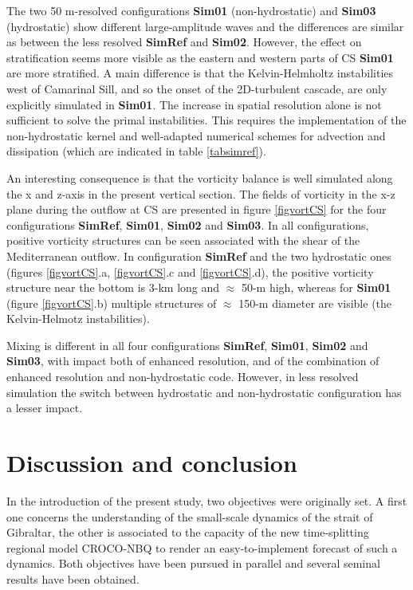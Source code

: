 \documentclass[a4paper,12pt]{article}
\begin{document}
The two 50 m-resolved configurations \textbf{Sim01} (non-hydrostatic) and \textbf{Sim03} (hydrostatic) show different large-amplitude waves and the differences are similar as between the less resolved \textbf{SimRef} and \textbf{Sim02}. However, the effect on stratification seems more visible as the eastern and western parts of CS \textbf{Sim01} are more stratified. A main difference is that the Kelvin-Helmholtz instabilities west of Camarinal Sill, and so the onset of the 2D-turbulent cascade, are only explicitly simulated in \textbf{Sim01}.
The increase in spatial resolution alone is not sufficient to solve the primal instabilities. This requires the implementation of the non-hydrostatic kernel and well-adapted numerical schemes for advection and dissipation (which are indicated in table \ref{tabsimref}).
 
An interesting consequence is that the vorticity balance is well simulated along the x and z-axis in the present vertical section. The fields of vorticity in the x-z plane during the outflow at CS are presented in figure \ref{figvortCS} for the four configurations \textbf{SimRef}, \textbf{Sim01}, \textbf{Sim02} and \textbf{Sim03}. In all configurations, positive vorticity structures can be seen associated with the shear of the Mediterranean outflow. In configuration \textbf{SimRef} and the two hydrostatic ones (figures \ref{figvortCS}.a, \ref{figvortCS}.c and \ref{figvortCS}.d), the positive vorticity structure near the bottom is 3-km long and $\approx$ 50-m high, whereas for \textbf{Sim01} (figure \ref{figvortCS}.b) multiple structures of $\approx$ 150-m diameter are visible (the Kelvin-Helmotz instabilities).
 
Mixing is different in all four configurations \textbf{SimRef}, \textbf{Sim01}, \textbf{Sim02} and \textbf{Sim03}, with impact  both of enhanced resolution, and of the combination of enhanced resolution and non-hydrostatic code. However, in less resolved simulation the switch between hydrostatic and non-hydrostatic configuration has a lesser impact.





\section{Discussion and conclusion}


In the introduction of the present study, two objectives were originally set. A first one concerns the understanding of the small-scale dynamics of the strait of Gibraltar, the other is associated to the capacity of the new time-splitting regional model CROCO-NBQ to render an easy-to-implement forecast of such a dynamics. Both objectives have been pursued in parallel and several seminal results have been obtained.
\end{document}
